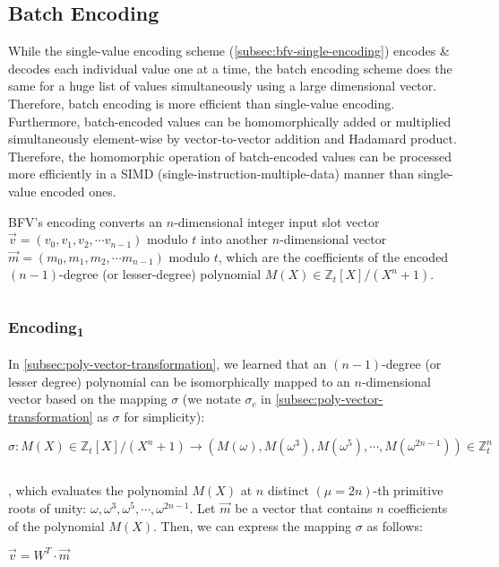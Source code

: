 \subsection{Batch Encoding}
\label{subsec:bfv-batch-encoding}

While the single-value encoding scheme (\autoref{subsec:bfv-single-encoding}) encodes \& decodes each individual value one at a time, the batch encoding scheme does the same for a huge list of values simultaneously using a large dimensional vector. Therefore, batch encoding is more efficient than single-value encoding. Furthermore, batch-encoded values can be homomorphically added or multiplied simultaneously element-wise by vector-to-vector addition and Hadamard product. Therefore, the homomorphic operation of batch-encoded values can be processed more efficiently in a SIMD (single-instruction-multiple-data) manner than single-value encoded ones. 

BFV's encoding converts an $n$-dimensional integer input slot vector $\vec{v} = (v_0, v_1, v_2, \cdots v_{n-1})$ modulo $t$ into another $n$-dimensional vector $\vec{m} = (m_0, m_1, m_2, \cdots m_{n-1})$ modulo $t$, which are the coefficients of the encoded $(n-1)$-degree (or lesser-degree) polynomial $M(X) \in \mathbb{Z}_t[X] / (X^n + 1)$. 

$ $

\subsubsection{\textsf{Encoding\textsubscript{1}}}  
\label{subsubsec:bfv-encoding-1} 

In \autoref{subsec:poly-vector-transformation}, we learned that an $(n-1)$-degree (or lesser degree) polynomial can be isomorphically mapped to an $n$-dimensional vector based on the mapping $\sigma$ (we notate $\sigma_c$ in \autoref{subsec:poly-vector-transformation} as $\sigma$ for simplicity): 

$\sigma: M(X) \in \mathbb{Z}_t[X]/(X^n + 1) \longrightarrow  (M(\omega),M(\omega^3),M(\omega^5), \cdots, M(\omega^{2n-1})) \in \mathbb{Z}_t^n$

$ $

, which evaluates the polynomial $M(X)$ at $n$ distinct $(\mu=2n)$-th primitive roots of unity: $\omega, \omega^3, \omega^5, \cdots, \omega^{2n-1}$. Let $\vec{m}$ be a vector that contains $n$ coefficients of the polynomial $M(X)$. Then, we can express the mapping $\sigma$ as follows: 

$\vec{v} = W^T \cdot \vec{m}$

